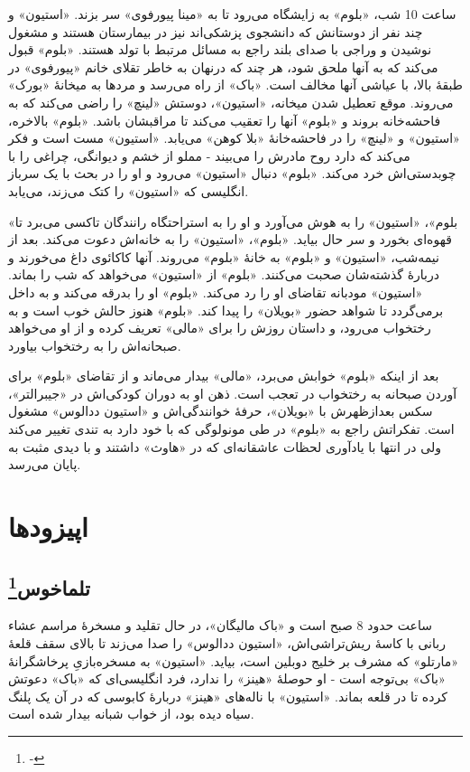 \documentclass[12pt]{book}
\newcommand{\noun}[1]{«{#1}»}
\begin{document}
    ساعت 10 شب، \noun{بلوم} به زایشگاه می‌رود تا به \noun{مینا پیورفوی} سر بزند. \noun{استیون} و چند نفر از دوستانش که دانشجوی پزشکی‌اند نیز در بیمارستان هستند و مشغول نوشیدن و وراجی با صدای بلند راجع به مسائل مرتبط با تولد هستند. \noun{بلوم} قبول می‌کند که به آنها ملحق شود، هر چند که درنهان به خاطر تقلای خانم \noun{پیورفوی} در طبقۀ بالا، با عیاشی آنها مخالف است. \noun{باک} از راه می‌رسد و مردها به میخانۀ \noun{بورک} می‌روند. موقع تعطیل شدن میخانه، \noun{استیون}، دوستش \noun{لینچ} را راضی می‌کند که به فاحشه‌خانه بروند و \noun{بلوم} آنها را تعقیب می‌کند تا مراقبشان باشد.
    \noun{بلوم} بالاخره، \noun{استیون} و \noun{لینچ} را در فاحشه‌خانۀ \noun{بلا کوهن} می‌یابد. \noun{استیون} مست است و فکر می‌کند که دارد روح مادرش را می‌بیند - مملو از خشم و دیوانگی، چراغی را با چوبدستی‌اش خرد می‌کند. \noun{بلوم} دنبال \noun{استیون} می‌رود و او را در بحث با یک سرباز انگلیسی که \noun{استیون} را کتک می‌زند، می‌یابد.

    \noun{بلوم}، \noun{استیون} را به هوش می‌آورد و او را به استراحتگاه رانندگان تاکسی می‌برد تا قهوه‌ای بخورد و سر حال بیاید. \noun{بلوم}، \noun{استیون} را به خانه‌اش دعوت می‌کند.
    بعد از نیمه‌شب، \noun{استیون} و \noun{بلوم} به خانۀ \noun{بلوم} می‌روند. آنها کاکائوی داغ می‌خورند و دربارۀ گذشته‌شان صحبت می‌کنند. \noun{بلوم} از \noun{استیون} می‌خواهد که شب را بماند. \noun{استیون} مودبانه تقاضای او را رد می‌کند. \noun{بلوم} او را بدرقه می‌کند و به داخل برمی‌گردد تا شواهد حضور \noun{بویلان} را پیدا کند. \noun{بلوم} هنوز حالش خوب است و به رختخواب می‌رود، و داستان روزش را برای \noun{مالی} تعریف کرده و از او می‌خواهد صبحانه‌اش را به رختخواب بیاورد.

    بعد از اینکه \noun{بلوم} خوابش می‌برد، \noun{مالی} بیدار می‌ماند و از تقاضای \noun{بلوم} برای آوردن صبحانه به رختخواب در تعجب است. ذهن او به دوران کودکی‌اش در \noun{جیبرالتر}، سکس بعدازظهرش با \noun{بویلان}، حرفۀ خوانندگی‌اش و \noun{استیون ددالوس} مشغول است. تفکراتش راجع به \noun{بلوم} در طی مونولوگی که با خود دارد به تندی تغییر می‌کند ولی در انتها با یادآوری لحظات عاشقانه‌ای که در \noun{هاوث} داشتند و با دیدی مثبت به پایان می‌رسد.
    
    \part{اپیزودها}
    \chapter[تلماخوس]{تلماخوس\protect\footnote{-}}\label{ep:1}
    ساعت حدود 8 صبح است و \noun{باک مالیگان‬}، در حال تقلید و مسخرۀ مراسم عشاء ربانی با کاسۀ ریش‌تراشی‌اش، \noun{استیون ددالوس} را صدا می‌زند تا بالای سقف قلعۀ \noun{مارتلو} که مشرف بر خلیج دوبلین است، بیاید.  \noun{استیون} به مسخره‌بازیِ پرخاشگرانۀ \noun{باک}  بی‌توجه است - او حوصلۀ \noun{هینز}  را ندارد، فرد انگلیسی‌ای که \noun{باک}  دعوتش کرده تا در قلعه بماند. \noun{استیون} با ناله‌های \noun{هینز}  دربارۀ کابوسی که در آن یک پلنگ سیاه دیده بود، از خواب شبانه بیدار شده است.
\end{document}
